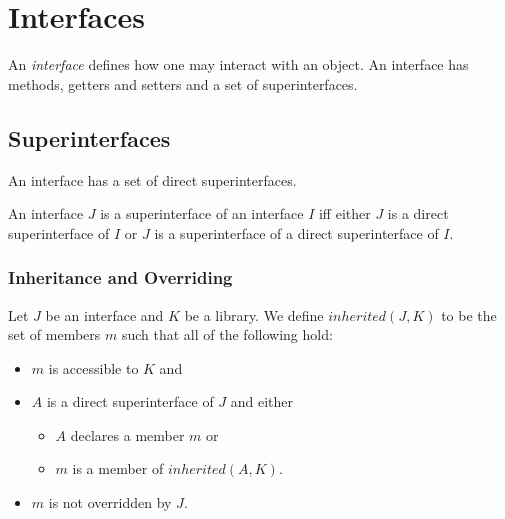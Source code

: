 \documentclass{article}
\begin{document}








\section{Interfaces}

\LMHash{}
An {\em interface} defines how one may interact with an object. An interface has methods, getters and setters and a set of superinterfaces.

\subsection{Superinterfaces}

\LMHash{}
An interface has a set of direct superinterfaces. 

\LMHash{}
An interface $J$ is a superinterface of an interface $I$ iff either $J$ is a direct superinterface of $I$ or $J$ is a superinterface of a direct superinterface of $I$.




\subsubsection{Inheritance and Overriding}

\LMHash{}
Let $J$ be an interface and $K$ be a library. We define $inherited(J, K)$  to be the set of members $m$ such that   all of the following hold:
\begin{itemize}
\item $m$ is accessible to $K$ and 
\item $A$ is a direct superinterface of $J$ and either 
  \begin{itemize}
  \item $A$ declares a member $m$  or
  \item $m$ is a member of $inherited(A, K)$.
  \end{itemize}
\item $m$ is not overridden by $J$.
\end{itemize}
\end{document}
